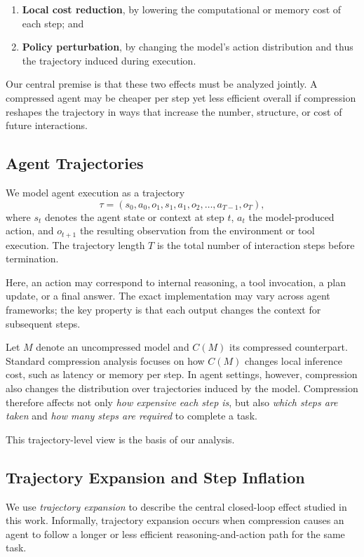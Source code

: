 \documentclass{article}
\begin{document}
\begin{enumerate}
    \item \textbf{Local cost reduction}, by lowering the computational or memory cost of each step; and
    \item \textbf{Policy perturbation}, by changing the model's action distribution and thus the trajectory induced during execution.
\end{enumerate}

Our central premise is that these two effects must be analyzed jointly. A compressed agent may be cheaper per step yet less efficient overall if compression reshapes the trajectory in ways that increase the number, structure, or cost of future interactions.

\subsection{Agent Trajectories}

We model agent execution as a trajectory
\[
\tau = (s_0, a_0, o_1, s_1, a_1, o_2, \dots, a_{T-1}, o_T),
\]
where $s_t$ denotes the agent state or context at step $t$, $a_t$ the model-produced action, and $o_{t+1}$ the resulting observation from the environment or tool execution. The trajectory length $T$ is the total number of interaction steps before termination.

Here, an action may correspond to internal reasoning, a tool invocation, a plan update, or a final answer. The exact implementation may vary across agent frameworks; the key property is that each output changes the context for subsequent steps.

Let $M$ denote an uncompressed model and $C(M)$ its compressed counterpart. Standard compression analysis focuses on how $C(M)$ changes local inference cost, such as latency or memory per step. In agent settings, however, compression also changes the distribution over trajectories induced by the model. Compression therefore affects not only \emph{how expensive each step is}, but also \emph{which steps are taken} and \emph{how many steps are required} to complete a task.

This trajectory-level view is the basis of our analysis.

\subsection{Trajectory Expansion and Step Inflation}

We use \emph{trajectory expansion} to describe the central closed-loop effect studied in this work. Informally, trajectory expansion occurs when compression causes an agent to follow a longer or less efficient reasoning-and-action path for the same task.
\end{document}
